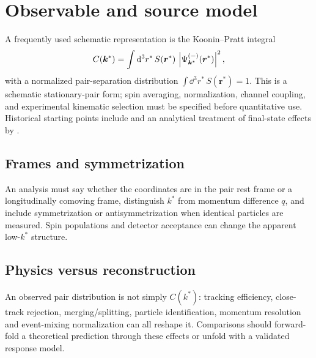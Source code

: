 \section{Observable and source model}\label{sec:cf-framework}
A frequently used schematic representation is the Koonin--Pratt integral
\begin{equation}\label{eq:cf-kp}
C(\bm{k}^{*})=\int \mathop{}\!\mathrm{d}^3r^{*}\,S(\bm{r}^{*})\,
\left\lvert \Psi_{\bm{k}^{*}}^{(-)}(\bm{r}^{*})\right\rvert^2,
\end{equation}
with a normalized pair-separation distribution $\int\dd^3r^*\,S(\bm r^*)=1$. This is a schematic stationary-pair form; spin averaging, normalization, channel coupling, and experimental kinematic selection must be specified before quantitative use. Historical starting points include \textcite{Koonin1977,Pratt1986} and an analytical treatment of final-state effects by \textcite{Lednicky1982}.

\subsection{Frames and symmetrization}
An analysis must say whether the coordinates are in the pair rest frame or a longitudinally comoving frame, distinguish $k^*$ from momentum difference $q$, and include symmetrization or antisymmetrization when identical particles are measured. Spin populations and detector acceptance can change the apparent low-$k^*$ structure.

\subsection{Physics versus reconstruction}
An observed pair distribution is not simply $C(k^*)$: tracking efficiency, close-track rejection, merging/splitting, particle identification, momentum resolution and event-mixing normalization can all reshape it. Comparisons should forward-fold a theoretical prediction through these effects or unfold with a validated response model.
